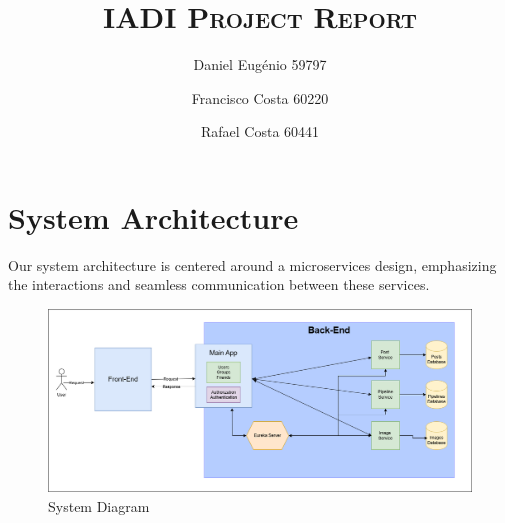 \documentclass[acmart, nonacm]{acmart}
\begin{document}
\makeatletter
\let\@authorsaddresses\@empty
\makeatother

\title{\textsc{IADI Project Report}}
\author{Daniel Eugénio 59797}
\author{Francisco Costa 60220}
\author{Rafael Costa 60441}
\newcommand{\mydate}{}
\date{\mydate}

\maketitle

\tableofcontents

\newpage
\section{System Architecture}

Our system architecture is centered around a microservices design, emphasizing the interactions and seamless communication between these services.
\begin{figure}[h]
    \includegraphics[width=\textwidth]{../Microservice Architecture/SystemDiagram}
    \caption{System Diagram}
\end{figure}

\end{document}
